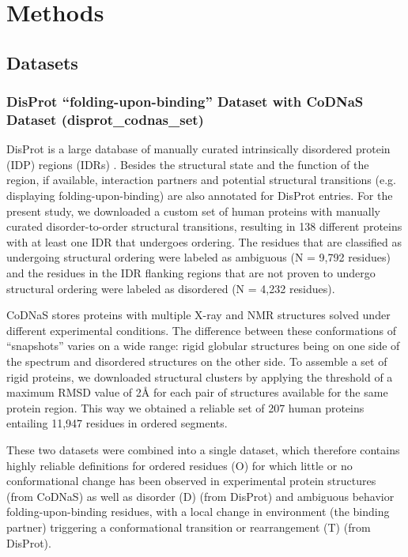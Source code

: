 \section{Methods}

\subsection{Datasets}

\subsubsection[DisProt ``folding-upon-binding'' Dataset with CoDNaS Dataset]{DisProt ``folding-upon-binding'' Dataset with CoDNaS Dataset (disprot_codnas_set)}

DisProt is a large database of manually curated intrinsically disordered protein (IDP) regions (IDRs) \cite{hatos_disprot_2019}. Besides the structural state and the function of the region, if available, interaction partners and potential structural transitions (e.g. displaying folding-upon-binding) are also annotated for DisProt entries. For the present study, we downloaded a custom set of human proteins with manually curated disorder-to-order structural transitions, resulting in 138 different proteins with at least one IDR that undergoes ordering. The residues that are classified as undergoing structural ordering were labeled as ambiguous (N = 9,792 residues) and the residues in the IDR flanking regions that are not proven to undergo structural ordering were labeled as disordered (N = 4,232 residues). 

CoDNaS \cite{monzon_codnas_2016} stores proteins with multiple X-ray and NMR structures solved under different experimental conditions. The difference between these conformations of ``snapshots'' varies on a wide range: rigid globular structures being on one side of the spectrum and disordered structures on the other side. To assemble a set of rigid proteins, we downloaded structural clusters by applying the threshold of a maximum RMSD value of 2Å for each pair of structures available for the same protein region. This way we obtained a reliable set of 207 human proteins entailing 11,947 residues in ordered segments.

These two datasets were combined into a single dataset, which therefore contains highly reliable definitions for ordered residues (O) for which little or no conformational change has been observed in experimental protein structures (from CoDNaS) as well as disorder (D) (from DisProt) and ambiguous behavior folding-upon-binding residues, with a local change in environment (the binding partner) triggering a conformational transition or rearrangement (T) (from DisProt).


